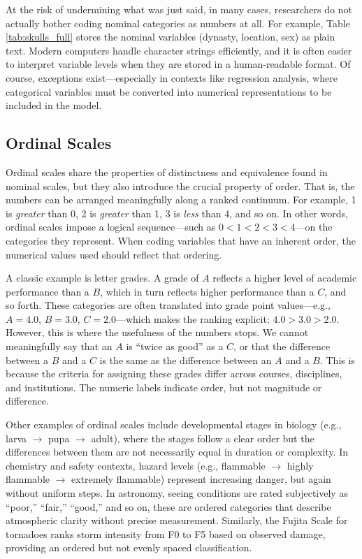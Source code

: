 At the risk of undermining what was just said, in many cases, researchers do not actually bother coding nominal categories as numbers at all. For example, Table \ref{tab:skulls_full} stores the nominal variables (dynasty, location, sex) as plain text. Modern computers handle character strings efficiently, and it is often easier to interpret variable levels when they are stored in a human-readable format. Of course, exceptions exist—especially in contexts like regression analysis, where categorical variables must be converted into numerical representations to be included in the model.

\subsection{Ordinal Scales}
\label{sec:ordinal}

Ordinal scales share the properties of distinctness and equivalence found in nominal scales, but they also introduce the crucial property of order. That is, the numbers can be arranged meaningfully along a ranked continuum. For example,  1 is \textit{greater} than 0, 2 is \textit{greater} than 1, 3 is \textit{less} than 4, and so on. In other words, ordinal scales impose a logical sequence—such as $0 < 1 < 2 < 3 < 4$—on the categories they represent. When coding variables that have an inherent order, the numerical values used should reflect that ordering.

A classic example is letter grades. A grade of $A$ reflects a higher level of academic performance than a $B$, which in turn reflects higher performance than a $C$, and so forth. These categories are often translated into grade point values—e.g., $A = 4.0$, $B = 3.0$, $C = 2.0$—which makes the ranking explicit: $4.0 > 3.0 > 2.0$. However, this is where the usefulness of the numbers stops. We cannot meaningfully say that an $A$ is ``twice as good'' as a $C$, or that the difference between a $B$ and a $C$ is the same as the difference between an $A$ and a $B$. This is because the criteria for assigning these grades differ across courses, disciplines, and institutions. The numeric labels indicate order, but not magnitude or difference.

Other examples of ordinal scales include developmental stages in biology (e.g., larva $\rightarrow$ pupa $\rightarrow$ adult), where the stages follow a clear order but the differences between them are not necessarily equal in duration or complexity. In chemistry and safety contexts, hazard levels (e.g., flammable $\rightarrow$ highly flammable $\rightarrow$ extremely flammable) represent increasing danger, but again without uniform steps. In astronomy, seeing conditions are rated subjectively as ``poor,'' ``fair,'' ``good,'' and so on, these are ordered categories that describe atmospheric clarity without precise measurement. Similarly, the Fujita Scale for tornadoes ranks storm intensity from F0 to F5 based on observed damage, providing an ordered but not evenly spaced classification.

